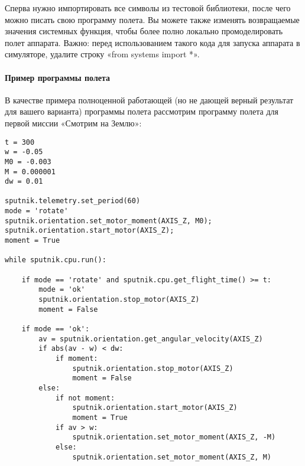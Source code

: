 \documentclass[12pt,a4paper]{article}
\begin{document}
               Сперва нужно импортировать все символы из тестовой библиотеки, после чего можно писать свою программу полета. Вы можете также изменять возвращаемые значения системных функция, чтобы более полно локально промоделировать полет аппарата.
Важно: перед использованием такого кода для запуска аппарата в симуляторе, удалите строку «from systems import *».

\paragraph{Пример программы полета}

В качестве примера полноценной работающей (но не дающей верный результат для вашего
варианта) программы полета рассмотрим программу полета для  первой миссии «Смотрим на
Землю»:

\begin{verbatim}
t = 300
w = -0.05
M0 = -0.003
M = 0.000001
dw = 0.01

sputnik.telemetry.set_period(60)
mode = 'rotate'
sputnik.orientation.set_motor_moment(AXIS_Z, M0);
sputnik.orientation.start_motor(AXIS_Z);
moment = True

while sputnik.cpu.run():

    if mode == 'rotate' and sputnik.cpu.get_flight_time() >= t: 
        mode = 'ok'
        sputnik.orientation.stop_motor(AXIS_Z)
        moment = False

    if mode == 'ok':
        av = sputnik.orientation.get_angular_velocity(AXIS_Z)
        if abs(av - w) < dw:
            if moment:
                sputnik.orientation.stop_motor(AXIS_Z)
                moment = False
        else:
            if not moment:
                sputnik.orientation.start_motor(AXIS_Z)
                moment = True
            if av > w:
                sputnik.orientation.set_motor_moment(AXIS_Z, -M)
            else:
                sputnik.orientation.set_motor_moment(AXIS_Z, M)

\end{verbatim}
\end{document}
